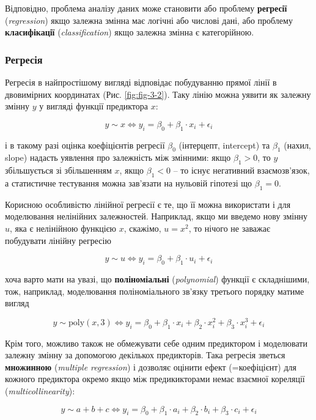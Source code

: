 \documentclass[
  11pt,
]{book}
\begin{document}
Відповідно, проблема аналізу даних може становити або проблему \textbf{регресії} (\emph{regression}) якщо залежна змінна має логічні або числові дані, або проблему \textbf{класифікації} (\emph{classification}) якщо залежна змінна є категорійною.

\subsubsection{Регресія}\label{ux440ux435ux433ux440ux435ux441ux456ux44f}

Регресія в найпростішому вигляді відповідає побудуванню прямої лінії в двовимірних координатах (Рис. \ref{fig:fig-3-2}). Таку лінію можна уявити як залежну змінну \(y\) у вигляді функції предиктора \(x\):

\[y \sim x \Longleftrightarrow y_i = \beta_0 + \beta_1 \cdot x_i + \epsilon_i\]

і в такому разі оцінка коефіцієнтів регресії \(\beta_0\) (інтерцепт, intercept) та \(\beta_1\) (нахил, slope) надасть уявлення про залежність між змінними: якщо \(\beta_1 > 0\), то \(y\) збільшується зі збільшенням \(x\), якщо \(\beta_1 < 0\) -- то існує негативний взаємозв'язок, а статистичне тестування можна зав'язати на нульовій гіпотезі що \(\beta_1 = 0\).

Корисною особливістю лінійної регресії є те, що її можна використати і для моделювання нелінійних залежностей. Наприклад, якщо ми введемо нову змінну \(u\), яка є нелінійною функцією \(x\), скажімо, \(u = x^2\), то нічого не заважає побудувати лінійну регресію

\[y \sim u \Longleftrightarrow y_i = \beta_0 + \beta_1 \cdot u_i + \epsilon_i\]

хоча варто мати на увазі, що \textbf{поліноміальні} (\emph{polynomial}) функції є складнішими, тож, наприклад, моделювання поліноміального зв'язку третього порядку матиме вигляд

\[y \sim \text{poly}(x, 3) \Longleftrightarrow y_i = \beta_0 + \beta_1 \cdot x_i + \beta_2 \cdot x_i^2 + \beta_3 \cdot x_i^3 + \epsilon_i\]

Крім того, можливо також не обмежувати себе одним предиктором і моделювати залежну змінну за допомогою декількох предикторів. Така регресія зветься \textbf{множинною} (\emph{multiple regression}) і дозволяє оцінити ефект (=коефіцієнт) для кожного предиктора окремо якщо між предикикторами немає взаємної кореляції (\emph{multicollinearity}):

\[y \sim a + b + c \Longleftrightarrow y_i = \beta_0 + \beta_1 \cdot a_i + \beta_2 \cdot b_i + \beta_3 \cdot c_i + \epsilon_i\]
\end{document}
